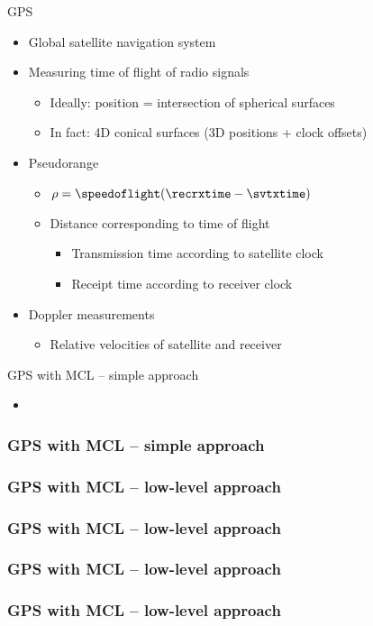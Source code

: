 \documentclass[utf8]{beamer}
\begin{document}
\begin{frame}{GPS}
    \begin{itemize}
        \item Global satellite navigation system
        \item Measuring time of flight of radio signals
        \begin{itemize}
            \item Ideally: position = intersection of spherical surfaces
            \item In fact: 4D conical surfaces (3D positions + clock offsets)
        \end{itemize}
        \item Pseudorange
        \begin{itemize}
            \item \(\rho = \speedoflight (\recrxtime - \svtxtime)\)
            \item Distance corresponding to time of flight
            \begin{itemize}
                \item Transmission time according to satellite clock
                \item Receipt time according to receiver clock
            \end{itemize}
        \end{itemize}
        \item Doppler measurements
        \begin{itemize}
            \item Relative velocities of satellite and receiver
        \end{itemize}
    \end{itemize}
\end{frame}

\begin{frame}{GPS with MCL -- simple approach}
    \begin{itemize}
        \item
    \end{itemize}
\end{frame}

\begin{frame}
    \frametitle{GPS with MCL -- simple approach}
\end{frame}

\begin{frame}
    \frametitle{GPS with MCL -- low-level approach}
\end{frame}

\begin{frame}
    \frametitle{GPS with MCL -- low-level approach}
\end{frame}

\begin{frame}
    \frametitle{GPS with MCL -- low-level approach}
\end{frame}

\begin{frame}
    \frametitle{GPS with MCL -- low-level approach}
\end{frame}
\end{document}

